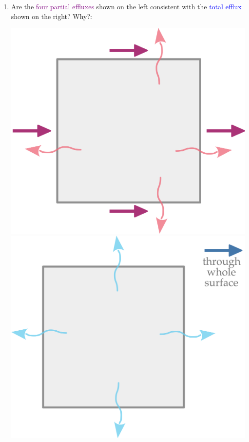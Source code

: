 \documentclass[a4paper,12pt,%
onecolumn,oneside,%
british%
]{memoir}
\renewcommand*{\|}[1][]{\nonscript\:#1\vert\nonscript\:\mathopen{}}
\begin{document}
\begin{exercise}
  \begin{enumerate}[para,label=\bfseries\arabic*.]
  \item Are the \textcolor{purple}{four partial effluxes} shown on the left consistent with the \textcolor{blue}{total efflux} shown on the right? Why?:\noprelistbreak
    \begin{center}
  \hspace*{\fill}
  \includegraphics[align=t,scale=0.08]{images/flux_square.pdf}
  \hfill
  \includegraphics[align=t,scale=0.08]{images/flux_square_sum.pdf}
  \hspace*{\fill}
\end{center}


\end{enumerate}
\end{exercise}
\end{document}
